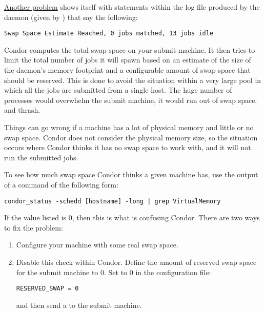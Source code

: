 \underline{Another problem} shows itself
with statements within the log file produced by the 
daemon (given by )
that say the following:

\begin{verbatim}
Swap Space Estimate Reached, 0 jobs matched, 13 jobs idle
\end{verbatim}

Condor computes the total swap space on your submit machine.
It then tries to limit the total number of jobs it
will spawn based on an estimate of the size of the 
daemon's memory footprint and a configurable amount of swap space
that should be reserved.
This is done to avoid the
situation within a very large pool
in which all the jobs are submitted from a single host.
The huge number of  processes would
overwhelm the submit machine,
it would run out of swap space, and thrash.

Things can go wrong if a machine has a lot of physical memory and
little or no swap space.
Condor does not consider the physical memory size,
so the situation occurs where Condor thinks
it has no swap space to work with,
and it will not run the submitted jobs.

To see how much swap space Condor thinks a given machine has, use
the output of a  command of the following form:

\begin{verbatim}
condor_status -schedd [hostname] -long | grep VirtualMemory
\end{verbatim}

If the value listed is 0, then this is what is confusing Condor.
There are two ways to fix the problem:

\begin{enumerate}
\item Configure your machine with some real swap space.

\item Disable this check within Condor.
Define the amount of reserved swap space for the submit machine to 0.
Set  to 0 in the configuration file:

\begin{verbatim}
RESERVED_SWAP = 0
\end{verbatim}

and then send a  to the submit machine.
\end{enumerate}

